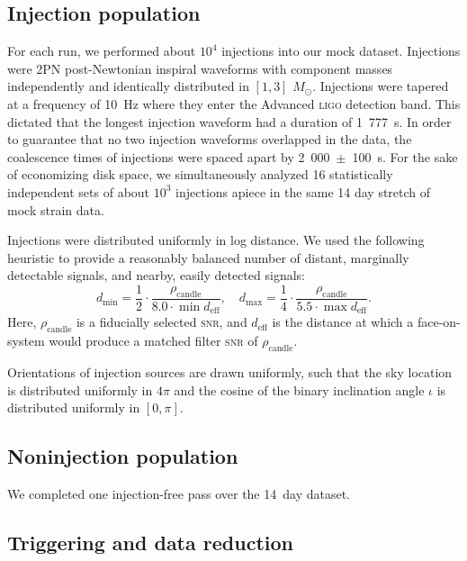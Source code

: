 \subsection{Injection population}

For each run, we performed about $10^4$ injections into our mock dataset.  Injections were 2PN post-Newtonian inspiral waveforms with component masses independently and identically distributed in $[1, 3]$ $M_\odot$.  Injections were tapered at a frequency of 10~Hz where they enter the Advanced \textsc{ligo} detection band.  This dictated that the longest injection waveform had a duration of 1~777~s.  In order to guarantee that no two injection waveforms overlapped in the data, the coalescence times of injections were spaced apart by {\color{red} 2~000~$\pm$~100~s}.  For the sake of economizing disk space, we simultaneously analyzed {\color{red} 16 statistically independent sets} of about $10^3$ injections apiece in the same {\color{red} 14 day} stretch of mock strain data.

Injections were distributed uniformly in log distance.  We used the following heuristic to provide a reasonably balanced number of distant, marginally detectable signals, and nearby, easily detected signals:
$$
d_\mathrm{min} = \frac{1}{2} \cdot \frac{\rho_\mathrm{candle}}{8.0 \cdot \min {d_\mathrm{eff}}}, \quad
d_\mathrm{max} = \frac{1}{4} \cdot \frac{\rho_\mathrm{candle}}{5.5 \cdot \max {d_\mathrm{eff}}}.
$$
Here, $\rho_\mathrm{candle}$ is a fiducially selected \textsc{snr}, and $d_\mathrm{eff}$ is the distance at which a face-on-system would produce a matched filter \textsc{snr} of $\rho_\mathrm{candle}$.

Orientations of injection sources are drawn uniformly, such that the sky location is distributed uniformly in $4\pi$ and the cosine of the binary inclination angle $\iota$ is distributed uniformly in $[0, \pi]$.

\subsection{Noninjection population}

We completed one injection-free pass over the 14~day dataset. 

\subsection{Triggering and data reduction}

